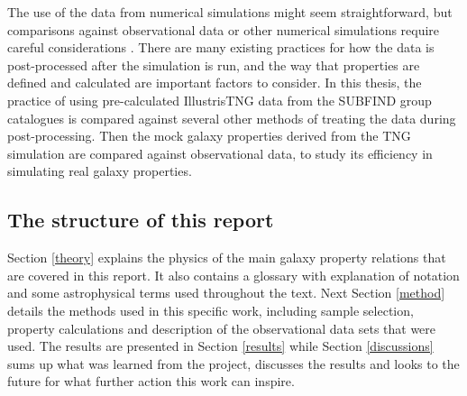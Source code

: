 The use of the data from numerical simulations might seem straightforward, but comparisons against observational data or other numerical simulations require careful considerations \parencite[see e.g.,][]{Sande2018, Schaye2015, Pillepich2017}. There are many existing practices for how the data is post-processed after the simulation is run, and the way that properties are defined and calculated are important factors to consider. In this thesis, the practice of using pre-calculated IllustrisTNG data from the SUBFIND group catalogues is compared against several other methods of treating the data during post-processing. Then the mock galaxy properties derived from the TNG simulation are compared against observational data, to study its efficiency in simulating real galaxy properties.

\subsection{The structure of this report}
Section \ref{theory} explains the physics of the main galaxy property relations that are covered in this report. It also contains a glossary with explanation of notation and some astrophysical terms used throughout the text. Next Section \ref{method} details the methods used in this specific work, including sample selection, property calculations and description of the observational data sets that were used. The results are presented in Section \ref{results} while Section \ref{discussions} sums up what was learned from the project, discusses the results and looks to the future for what further action this work can inspire.
